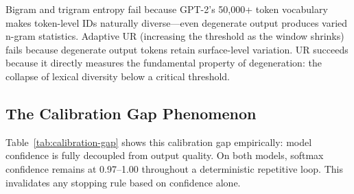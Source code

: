 \documentclass[11pt]{article}
\begin{document}
\begin{table}[t]
\centering
\caption{Alternative signals tested on degenerating models. Only UR achieves reliable detection.}
\label{tab:alternative-signals}
\end{table}

Bigram and trigram entropy fail because GPT-2's 50,000+ token vocabulary makes token-level IDs naturally diverse---even degenerate output produces varied n-gram statistics. Adaptive UR (increasing the threshold as the window shrinks) fails because degenerate output tokens retain surface-level variation. UR succeeds because it directly measures the fundamental property of degeneration: the collapse of lexical diversity below a critical threshold.

\subsection{The Calibration Gap Phenomenon}
\label{sec:calibration-gap}

Table~\ref{tab:calibration-gap} shows this calibration gap empirically: model confidence is fully decoupled from output quality. On both models, softmax confidence remains at 0.97--1.00 throughout a deterministic repetitive loop. This invalidates any stopping rule based on confidence alone.

\begin{table}[t]
\centering
\caption{Softmax confidence during degenerate generation. Confidence remains at 0.97--1.00 despite the model producing a deterministic loop.}
\label{tab:calibration-gap}
\end{table}
\end{document}
